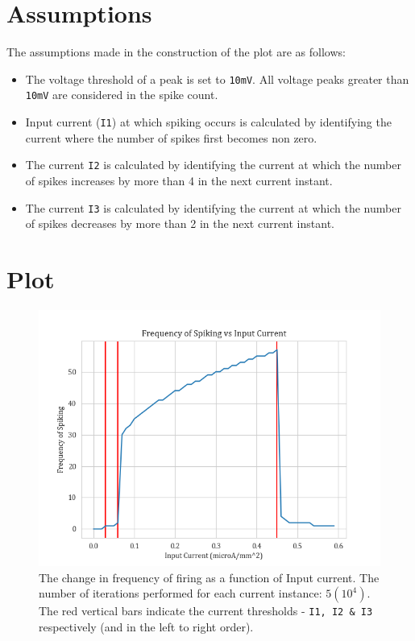 \documentclass[12pt,a4paper]{article}
\def\tt#1{\texttt{#1}}
\begin{document}
\section{Assumptions}
The assumptions made in the construction of the plot are as follows:
\begin{itemize}
	\itemsep0em
	\item The voltage threshold of a peak is set to \tt{10mV}. All voltage peaks greater than \tt{10mV} are considered in the spike count.
	\item Input current (\tt{I1}) at which spiking occurs is calculated by identifying the current where the number of spikes first becomes non zero.
	\item The current \tt{I2} is calculated by identifying the current at which  the number of spikes increases by more than 4 in the next current instant.
	\item The current \tt{I3} is calculated by identifying the current at which  the number of spikes decreases by more than 2 in the next current instant.
\end{itemize}

\section{Plot}
\vspace{-1em}
\begin{figure}[H]
	\centering
	\includegraphics[scale=0.6]{images/frequency.png}
	\caption{The change in frequency of firing as a function of Input current. The number of iterations performed for each current instance: $5(10^4)$. The red vertical bars indicate the current thresholds - \tt{I1, I2 \& I3} respectively (and in the left to right order).}
\end{figure}
\end{document}
